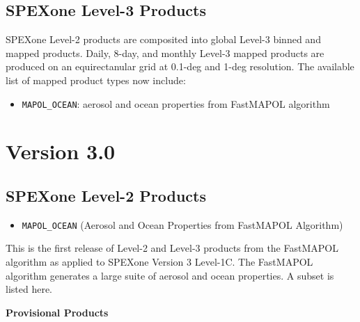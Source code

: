 \documentclass[
  11pt,
  letterpaper,
]{scrreprt}
\providecommand{\tightlist}{%
  \setlength{\itemsep}{0pt}\setlength{\parskip}{0pt}}
\begin{document}
\subsection*{SPEXone Level-3 Products}\label{spexone-level-3-products}

SPEXone Level-2 products are composited into global Level-3 binned and
mapped products. Daily, 8-day, and monthly Level-3 mapped products are
produced on an equirectanular grid at 0.1-deg and 1-deg resolution. The
available list of mapped product types now include:

\begin{itemize}
\tightlist
\item
  \texttt{MAPOL\_OCEAN}: aerosol and ocean properties from FastMAPOL
  algorithm
\end{itemize}

\section*{Version 3.0}\label{version-3.0-1}


\subsection*{SPEXone Level-2 Products}\label{spexone-level-2-products-1}

\begin{itemize}
\tightlist
\item
  \texttt{MAPOL\_OCEAN} (Aerosol and Ocean Properties from FastMAPOL
  Algorithm)
\end{itemize}

This is the first release of Level-2 and Level-3 products from the
FastMAPOL algorithm as applied to SPEXone Version 3 Level-1C. The
FastMAPOL algorithm generates a large suite of aerosol and ocean
properties. A subset is listed here.

\textbf{Provisional Products}
\end{document}

